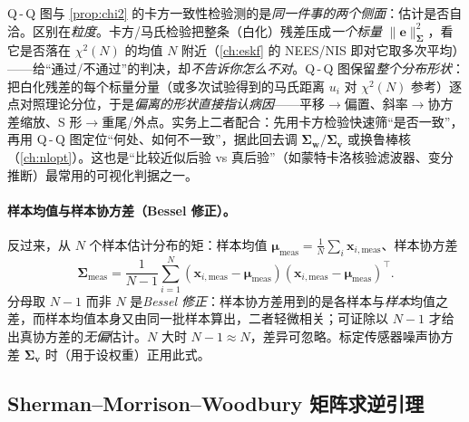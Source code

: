 \begin{insight}
Q\,-\,Q 图与 \cref{prop:chi2} 的卡方一致性检验测的是\emph{同一件事的两个侧面}：估计是否自洽。区别在\emph{粒度}。卡方/马氏检验把整条（白化）残差压成\emph{一个标量} $\|\mathbf{e}\|_{\boldsymbol{\Sigma}}^2$，看它是否落在 $\chi^2(N)$ 的均值 $N$ 附近（\cref{ch:eskf} 的 NEES/NIS 即对它取多次平均）——给“通过/不通过”的判决，却\emph{不告诉你怎么不对}。Q\,-\,Q 图保留\emph{整个分布形状}：把白化残差的每个标量分量（或多次试验得到的马氏距离 $u_i$ 对 $\chi^2(N)$ 参考）逐点对照理论分位，于是\emph{偏离的形状直接指认病因}——平移$\to$偏置、斜率$\to$协方差缩放、S 形$\to$重尾/外点。实务上二者配合：先用卡方检验快速筛“是否一致”，再用 Q\,-\,Q 图定位“何处、如何不一致”，据此回去调 $\boldsymbol{\Sigma}_{\mathbf{w}}/\boldsymbol{\Sigma}_{\mathbf{v}}$ 或换鲁棒核（\cref{ch:nlopt}）。这也是“比较近似后验 vs 真后验”（如蒙特卡洛核验滤波器、变分推断）最常用的可视化判据之一。
\end{insight}

\paragraph{样本均值与样本协方差（Bessel 修正）。}
反过来，从 $N$ 个样本估计分布的矩：样本均值 $\boldsymbol{\mu}_{\text{meas}}=\tfrac1N\sum_i\mathbf{x}_{i,\text{meas}}$、样本协方差
\begin{equation}
  \boldsymbol{\Sigma}_{\text{meas}}=\frac{1}{N-1}\sum_{i=1}^{N}(\mathbf{x}_{i,\text{meas}}-\boldsymbol{\mu}_{\text{meas}})(\mathbf{x}_{i,\text{meas}}-\boldsymbol{\mu}_{\text{meas}})^\top.
  \label{eq:sample-cov}
\end{equation}
分母取 $N-1$ 而非 $N$ 是\emph{Bessel 修正}：样本协方差用到的是各样本与\emph{样本}均值之差，而样本均值本身又由同一批样本算出，二者轻微相关；可证除以 $N-1$ 才给出真协方差的\emph{无偏}估计。$N$ 大时 $N-1\approx N$，差异可忽略。标定传感器噪声协方差 $\boldsymbol{\Sigma}_{\mathbf{v}}$ 时（用于设权重）正用此式。

\subsection{Sherman–Morrison–Woodbury 矩阵求逆引理}
\label{sec:est-smw}

